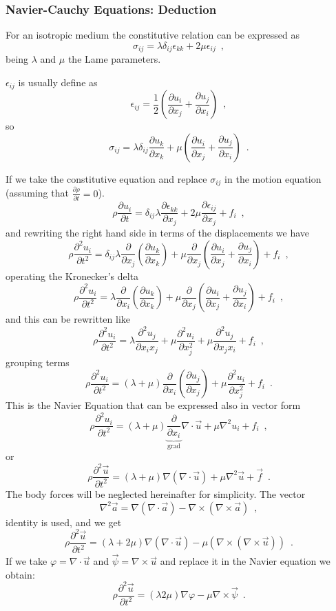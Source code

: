\documentclass{beamer}
\newcommand{\pardiff}[2]{\frac{\partial #1}{\partial #2}}
\begin{document}
\begin{frame}[allowframebreaks]\frametitle{Navier-Cauchy Equations: Deduction}
For an isotropic medium the constitutive relation can be expressed as
\[\sigma_{ij} = \lambda \delta_{ij}\epsilon_{kk} + 2\mu \epsilon_{ij} \enspace ,\]
being $\lambda$ and $\mu$ the Lame parameters.

$\epsilon_{ij}$ is usually define as
\[\epsilon_{ij} = \frac{1}{2} \left( \pardiff{u_i}{x_j} + \pardiff{u_j}{x_i} \right) \enspace ,\]
so
\[\sigma_{ij} = \lambda \delta_{ij} \pardiff{u_k}{x_k} + \mu \left( \pardiff{u_i}{x_j} + \pardiff{u_j}{x_i} \right) \enspace .\]

If we take the constitutive equation and replace $\sigma_{ij}$ in the motion equation (assuming that $\pardiff{\rho}{t}=0$).
\[\rho \pardiff{u_i}{t} = \delta_{ij} \lambda \pardiff{\epsilon_{kk}}{x_j} + 2\mu \pardiff{\epsilon_{ij}}{x_j} +f_i \enspace ,\]
and rewriting the right hand side in terms of the displacements we have
\[\rho \pardiff{^2 u_i}{t^2} = \delta_{ij} \lambda \pardiff{}{x_j}\left( \pardiff{u_k}{x_k}\right) + \mu \pardiff{ }{x_j}\left( \pardiff{u_i}{x_j} + \pardiff{u_j}{x_i}\right) + f_i \enspace ,\]
operating the Kronecker's delta
\[\rho \pardiff{^2 u_i}{t^2} = \lambda \pardiff{}{x_i}\left( \pardiff{u_k}{x_k}\right) + \mu \pardiff{}{x_j}\left( \pardiff{u_i}{x_j} + \pardiff{u_j}{x_i} \right) + f_i \enspace ,\]
and this can be rewritten like
\[\rho \pardiff{^2 u_i}{t^2} = \lambda  \pardiff{^2 u_j}{x_i x_j} + \mu \pardiff{^2 u_i}{x_j^2} + \mu \pardiff{^2 u_j}{x_j x_i} + f_i \enspace ,\]
grouping terms
\begin{equation}
\rho \pardiff{^2 u_i}{t^2} = (\lambda + \mu)  \pardiff{}{x_i}\left( \pardiff{u_j}{x_j} \right) + \mu \pardiff{^2 u_i}{x_j^2}  + f_i \enspace .
\label{eq:navierInd}
\end{equation}
This is the Navier Equation that can be expressed also in vector form
\[\rho \pardiff{^2 u_i}{t^2} = (\lambda + \mu)  \underbrace{\pardiff{}{x_i}}_{\mbox{grad}}\nabla \cdot \vec{u} + \mu \nabla^2 u_i + f_i \enspace ,\]
or
\begin{equation}
\rho \pardiff{^2 \vec{u}}{t^2} = (\lambda + \mu)  \nabla (\nabla\cdot \vec{u})+ \mu \nabla^2 \vec{u} + \vec{f} \enspace .
\label{eq:navierVec}
\end{equation}
The body forces will be neglected hereinafter for simplicity. The vector 
\[\nabla^2 \vec{a} = \nabla (\nabla \cdot \vec{a}) - \nabla \times (\nabla \times \vec{a}) \enspace ,\]
identity is used, and we get
\[\rho \pardiff{^2 \vec{u}}{t^2} = (\lambda + 2\mu) \nabla(\nabla \cdot \vec{u}) - \mu (\nabla \times (\nabla \times \vec{u})) \enspace .\]
If we take $\varphi = \nabla \cdot \vec{u} $ and $\vec{\psi} = \nabla \times \vec{u}$ and replace it in the Navier equation we obtain:
\begin{equation}
\rho \pardiff{^2 \vec{u}}{t^2} = (\lambda 2\mu) \nabla \varphi - \mu \nabla \times \vec{\psi} \enspace .
\label{eq:waveHelm}
\end{equation}
\end{frame} 
\end{document}
